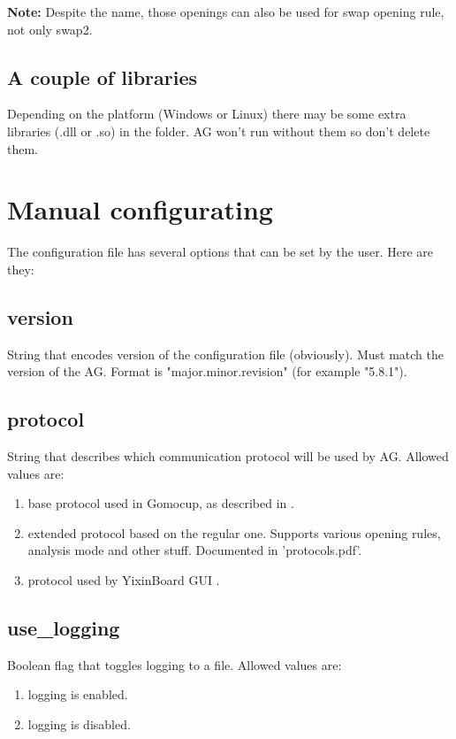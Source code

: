 \documentclass[12pt,a4paper]{article}
\begin{document}
\textbf{Note:} Despite the name, those openings can also be used for swap opening rule, not only swap2.

\subsection{A couple of libraries}
Depending on the platform (Windows or Linux) there may be some extra libraries (.dll or .so) in the folder. AG won't run without them so don't delete them.


\newpage
\section{Manual configurating}
The configuration file has several options that can be set by the user. Here are they:

\subsection{version}
String that encodes version of the configuration file (obviously). Must match the version of the AG. Format is "major.minor.revision" (for example "5.8.1").

\subsection{protocol}
String that describes which communication protocol will be used by AG. Allowed values are:
\begin{enumerate}[leftmargin=7.5em]
	\item[\text{"gomocup"}]{base protocol used in Gomocup, as described in \cite{newprotocol}.}
	\item[\text{"extended{\_}gomocup"}]{extended protocol based on the regular one. Supports various opening rules, analysis mode and other stuff. Documented in 'protocols.pdf'.}
	\item[\text{"yixinboard"}]{protocol used by YixinBoard GUI \cite{yixinboard}.}
\end{enumerate}

\subsection{use{\_}logging}
Boolean flag that toggles logging to a file. Allowed values are:
\begin{enumerate}[leftmargin=7.5em]
	\item[\text{"true"}]{logging is enabled.}
	\item[\text{"false"}]{logging is disabled.}
\end{enumerate}
\end{document}
